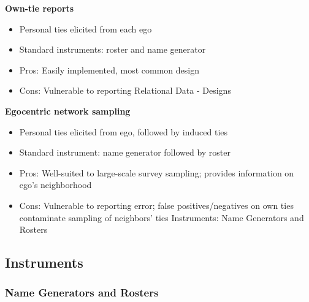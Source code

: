 \documentclass[]{book}
\theoremstyle{definition}
\theoremstyle{definition}
\theoremstyle{definition}
\theoremstyle{remark}
\begin{document}
\textbf{Own-tie reports}

\begin{itemize}
\item Personal ties elicited from each ego 
\item Standard instruments: roster and name generator 
\item Pros: Easily implemented, most common design 
\item Cons: Vulnerable to reporting Relational Data - Designs 
\end{itemize}

\noindent
\textbf{Egocentric network sampling}

\begin{itemize}
\item Personal ties elicited from ego, followed by induced ties 
\item Standard instrument: name generator followed by roster 
\item Pros: Well-suited to large-scale survey sampling; provides information 
on ego's neighborhood 
\item Cons: Vulnerable to reporting error; false positives/negatives on own 
ties contaminate sampling of neighbors' ties Instruments: Name Generators 
and Rosters 
\end{itemize}

\subsection{Instruments}

\subsubsection{Name Generators and Rosters}
\end{document}
